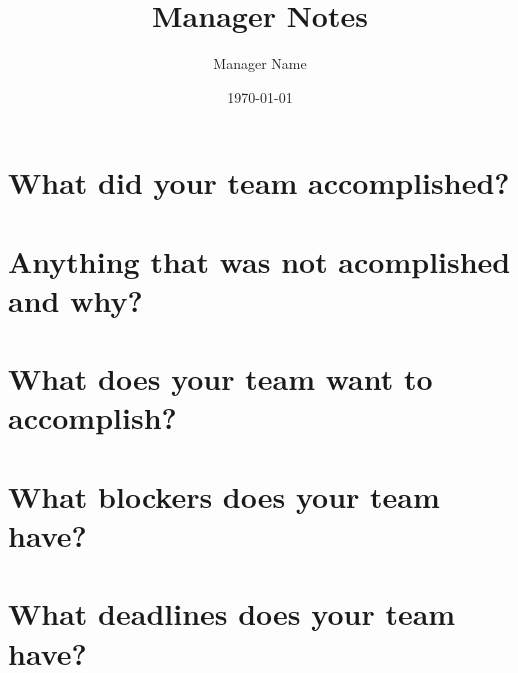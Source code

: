 \documentclass{article}
\title{Manager Notes} \bigbreak
\author{Manager Name}
\date{\today}
\begin{document}
\maketitle

\section{What did your team accomplished?}








\section{Anything that was not acomplished and why?}







\section{What does your team want to accomplish?}










\section{What blockers does your team have?}








\section{What deadlines does your team have?}
\end{document}
